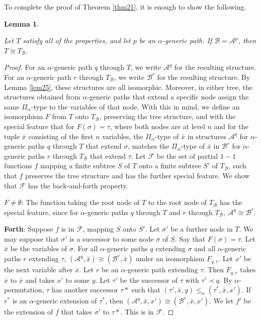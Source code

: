 \documentclass{article}
\newtheorem{lem}[thm]{Lemma}
\begin{document}
To complete the proof of Theorem \ref{thm21}, it is enough to show the following.

\begin{lem}
\label{lem26}

Let $T$ satisfy all of the properties, and let $p$ be an $\alpha$-generic path.  If $\mathcal{B} = \mathcal{A}^p$, then $T\cong T_\mathcal{B}$.  
\end{lem}

\begin{proof}   %

For an $\alpha$-generic path $q$ through $T$, we write $\mathcal{A}^q$ for the resulting structure.  For an $\alpha$-generic path $r$ through $T_\mathcal{B}$, we write $\mathcal{B}^r$ for the resulting structure.  By Lemma \ref{lem25}, these structures are all isomorphic.  Moreover, in either tree, the structures obtained from $\alpha$-generic paths that extend a specific node assign the same $\Pi_\alpha$-type to the variables of that node.  With this in mind, we define an isomorphism $F$ from $T$ onto $T_\mathcal{B}$, preserving the tree structure, and with the special feature that for $F(\sigma) = \tau$, where both nodes are at level $n$ and for the tuple $\bar{x}$ consisting of the first $n$ variables, the $\Pi_\alpha$-type of $\bar{x}$ in structures $\mathcal{A}^q$ for $\alpha$-generic paths $q$ through $T$ that extend 
$\sigma$, matches the $\Pi_\alpha$-type of $\bar{x}$ in $\mathcal{B}^r$ for $\alpha$-generic paths $r$ through $T_\mathcal{B}$ that extend $\tau$.  Let $\mathcal{F}$ be the set of partial $1-1$ functions $f$ mapping a finite subtree $S$ of $T$ onto a finite subtree $S'$ of $T_\mathcal{B}$, such that $f$ preserves the tree structure and has the further special feature.  We show that $\mathcal{F}$ has the back-and-forth property.  

\bigskip
\noindent     
\textbf{$F\not=\emptyset$}:  The function taking the root node of $T$ to the root node of $T_\mathcal{B}$ has the special feature, since for $\alpha$-generic paths $q$ through $T$ and $r$ through $T_\mathcal{B}$, $\mathcal{A}^q\cong\mathcal{B}^r$.  

\bigskip
\noindent
\textbf{Forth}:  Suppose $f$ is in $\mathcal{F}$, mapping $S$ onto $S'$.  Let $\sigma'$ be a further node in $T$.  We may suppose that $\sigma'$ is a successor to some node $\sigma$ of $S$.  Say that $F(\sigma) = \tau$.  Let $\bar{x}$ be the variables of $\sigma$.  For all $\alpha$-generic paths $q$ extending $\sigma$ and all $\alpha$-generic paths $r$ extending $\tau$, $(\mathcal{A}^q,\bar{x})\cong(\mathcal{B}^r,\bar{x})$ under an isomorphism $F_{q,r}$.  Let $x'$ be the next variable after $\bar{x}$. Let $r$ be an $\alpha$-generic path extending $\tau$.  Then $F_{q,r}$ takes $\bar{x}$ to $\bar{x}$ and takes $x'$ to some $y$.  Let $\tau'$ be the successor of $\tau$ with $\tau'\prec q$.  By $\alpha$-permutation, $\tau$ has another successor $\tau*$ such that $(\tau',\bar{x},y)\leq_\alpha(\tau^*,\bar{x},x')$.  If $r^*$ is an $\alpha$-generic extension of $\tau^*$, then 
$(\mathcal{A}^q,\bar{x},x')\cong(\mathcal{B}^r,\bar{x},x')$.  We let $f'$ be the extension of $f$ that takes $\sigma'$ to $\tau*$.  This is in $\mathcal{F}$. 


\end{proof}
\end{document}
